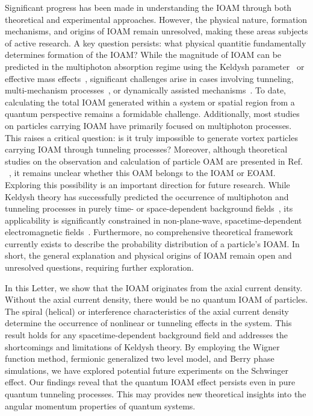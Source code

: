 \documentclass[prl,twocolumn,floatfix,amsmath,nofootinbib,superscriptaddress,amssymb,preprintnumbers,floatfix]{revtex4-1}
\begin{document}
Significant progress has been made in understanding the IOAM through both theoretical and experimental approaches. However, the physical nature, formation mechanisms, and origins of IOAM remain unresolved, making these areas subjects of active research. A key question persists: what physical quantitie fundamentally determines formation of the IOAM? While the magnitude of IOAM can be predicted in the multiphoton absorption regime using the Keldysh parameter~\cite{Keldysh:1965ojf} or effective mass effects~\cite{Kohlfurst:2013ura}, significant challenges arise in cases involving tunneling, multi-mechanism processes~\cite{Kohlfurst:2019mag}, or dynamically assisted mechanisms~\cite{Schutzhold:2008pz}.
To date, calculating the total IOAM generated within a system or spatial region from a quantum perspective remains a formidable challenge. Additionally, most studies on particles carrying IOAM have primarily focused on multiphoton processes. This raises a critical question: is it truly impossible to generate vortex particles carrying IOAM through tunneling processes? Moreover, although theoretical studies on the observation and calculation of particle OAM are presented in Ref. ~\cite{Ji:1996ek}, it remains unclear whether this OAM belongs to the IOAM or EOAM. Exploring this possibility is an important direction for future research.
While Keldysh theory has successfully predicted the occurrence of multiphoton and tunneling processes in purely time- or space-dependent background fields~\cite{Dunne:2005sx,Dunne:2006st,Amat:2022uxq}, its applicability is significantly constrained in non-plane-wave, spacetime-dependent electromagnetic fields~\cite{Schneider:2014mla,Schneider:2018huk,Amat:2023vwv}. Furthermore, no comprehensive theoretical framework currently exists to describe the probability distribution of a particle's IOAM. In short, the general explanation and physical origins of IOAM remain open and unresolved questions, requiring further exploration.

In this Letter, we show that the IOAM originates from the axial current density. Without the axial current density, there would be no quantum IOAM of particles. The spiral (helical) or interference characteristics of the axial current density determine the occurrence of nonlinear or tunneling effects in the system. This result holds for any spacetime-dependent background field and addresses the shortcomings and limitations of Keldysh theory. By employing the Wigner function method, fermionic generalized two level model, and Berry phase simulations, we have explored potential future experiments on the Schwinger effect. Our findings reveal that the quantum IOAM effect persists even in pure quantum tunneling processes. This may provides new theoretical insights into the angular momentum properties of quantum systems.
\end{document}
